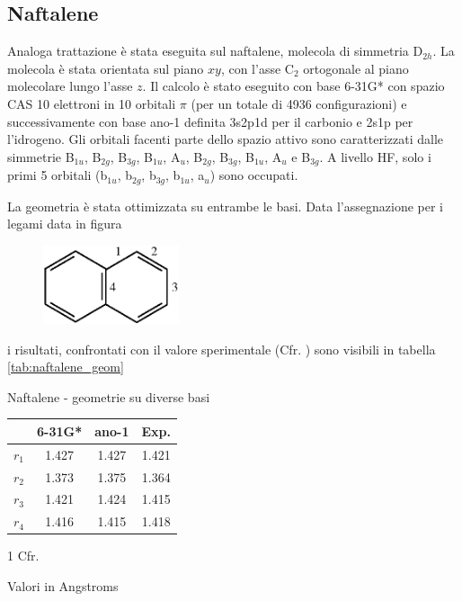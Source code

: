 \subsection{Naftalene}

Analoga trattazione \`e stata eseguita sul naftalene, molecola di simmetria
D$_{2h}$.
La molecola \`e stata orientata sul piano $xy$, con l'asse C$_2$ ortogonale al
piano molecolare lungo l'asse $z$.
Il calcolo \`e stato eseguito con base 6-31G* con spazio CAS 10 elettroni in
10 orbitali $\pi$ (per un totale di 4936 configurazioni) e successivamente
con base ano-1 definita 3s2p1d per il carbonio e 2s1p per l'idrogeno. Gli
orbitali facenti parte dello spazio attivo sono caratterizzati dalle
simmetrie B$_{1u}$, B$_{2g}$, B$_{3g}$, B$_{1u}$, A$_u$, B$_{2g}$, B$_{3g}$,
B$_{1u}$, A$_u$ e B$_{3g}$.  A livello HF, solo i primi 5 orbitali
(b$_{1u}$, b$_{2g}$, b$_{3g}$, b$_{1u}$, a$_u$) sono occupati.

La geometria \`e stata ottimizzata su entrambe le basi. Data l'assegnazione
per i legami data in figura

\begin{figure}[ht]
\begin{center}
\includegraphics[angle=0,width=4cm,keepaspectratio]{immagini/naftalene/geom.eps}
\end{center}
\end{figure}

i risultati, confrontati con il valore sperimentale (Cfr. \cite{prsls-258-1960-270})
sono visibili in tabella \ref{tab:naftalene_geom}
\begin{center}
\begin{threeparttable}
\caption{\small Naftalene - geometrie su diverse basi}
\label{tab:naftalene_geom}
\small
\begin{tabular}{|l|c|c|c|}
\hline
					& 6-31G*	& ano-1		&	Exp.\tnote{1}	\\ 
\hline
$r_1$				& 1.427		& 1.427		&	1.421	\\
$r_2$				& 1.373		& 1.375		&	1.364	\\
$r_3$				& 1.421		& 1.424		&	1.415	\\
$r_4$				& 1.416		& 1.415		&	1.418	\\
\hline
\end{tabular}
\begin{tablenotes}
\small
 \item[1] Cfr. \cite{prsls-258-1960-270}
 \item[] Valori in Angstroms
\end{tablenotes}
\end{threeparttable}
\end{center}

